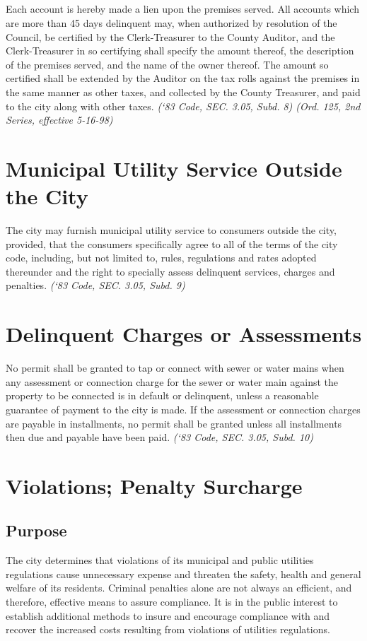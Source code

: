 \subsection{}
Each account is hereby made a lien upon the premises served. All accounts which are more than 45 days delinquent may, when authorized by resolution of the Council, be certified by the Clerk-Treasurer to the County Auditor, and the Clerk-Treasurer in so certifying shall specify the amount thereof, the description of the premises served, and the name of the owner thereof. The amount so certified shall be extended by the Auditor on the tax rolls against the premises in the same manner as other taxes, and collected by the County Treasurer, and paid to the city along with other taxes.\newline
\emph{(‘83 Code, SEC. 3.05, Subd. 8) (Ord. 125, 2nd Series, effective 5-16-98)}
\section{Municipal Utility Service Outside the City}
The city may furnish municipal utility service to consumers outside the city, provided, that the consumers specifically agree to all of the terms of the city code, including, but not limited to, rules, regulations and rates adopted thereunder and the right to specially assess delinquent services, charges and penalties.\newline
\emph{(‘83 Code, SEC. 3.05, Subd. 9)}
\section{Delinquent Charges or Assessments}
No permit shall be granted to tap or connect with sewer or water mains when any assessment or connection charge for the sewer or water main against the property to be connected is in default or delinquent, unless a reasonable guarantee of payment to the city is made.  If the assessment or connection charges are payable in installments, no permit shall be granted unless all installments then due and payable have been paid.\newline
\emph{(‘83 Code, SEC. 3.05, Subd. 10)}

\setcounter{section}{97}
\section{Violations; Penalty Surcharge}
\subsection{Purpose}
The city determines that violations of its municipal and public utilities regulations cause unnecessary expense and threaten the safety, health and general welfare of its residents.  Criminal penalties alone are not always an efficient, and therefore, effective means to assure compliance.  It is in the public interest to establish additional methods to insure and encourage compliance with and recover the increased costs resulting from violations of utilities regulations.
